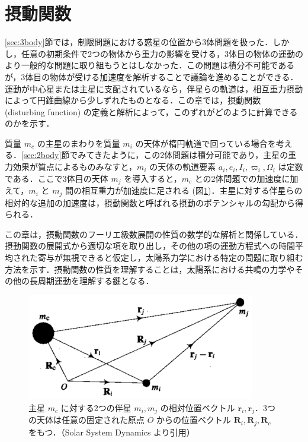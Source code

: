 \documentclass[11pt,a4paper,oneside,onecolumn]{jreport}
\begin{document}
\section{摂動関数 \label{sec:disturb_func}}
\ref{sec:3body}節では，制限問題における惑星の位置から3体問題を扱った．しかし，任意の初期条件で2つの物体から重力の影響を受ける，3体目の物体の運動のより一般的な問題に取り組もうとはしなかった．この問題は積分不可能であるが，3体目の物体が受ける加速度を解析することで議論を進めることができる．運動が中心星または主星に支配されているなら，伴星らの軌道は，相互重力摂動によって円錐曲線から少しずれたものとなる．この章では，摂動関数 (disturbing function) の定義と解析によって，このずれがどのように計算できるのかを示す．

質量 $m_c$ の主星のまわりを質量 $m_i$ の天体が楕円軌道で回っている場合を考える．\ref{sec:2body}節でみてきたように，この2体問題は積分可能であり，主星の重力効果が質点によるものみなすと，$m_i$ の天体の軌道要素 $a_i, e_i, I_i, \varpi_i, \Omega_i$ は定数である．ここで3体目の天体 $m_j$ を導入すると，$m_c$ との2体問題での加速度に加えて，$m_i$ と $m_j$ 間の相互重力が加速度に足される (図\ref{fig:disturbingfunc})．主星に対する伴星らの相対的な追加の加速度は，摂動関数と呼ばれる摂動のポテンシャルの勾配から得られる．

この章は，摂動関数のフーリエ級数展開の性質の数学的な解析と関係している．摂動関数の展開式から適切な項を取り出し，その他の項の運動方程式への時間平均された寄与が無視できると仮定し，太陽系力学における特定の問題に取り組む方法を示す．摂動関数の性質を理解することは，太陽系における共鳴の力学やその他の長周期運動を理解する鍵となる．

\begin{figure}[H]
\centering
\includegraphics[width=10cm]{./image/sec6_1.pdf}
\caption{主星 $m_c$ に対する2つの伴星 $m_i, m_j$ の相対位置ベクトル ${\bm r}_i, {\bm r}_j$．3つの天体は任意の固定された原点 $O$ からの位置ベクトル ${\bm R}_i, {\bm R}_j, {\bm R}_c$ をもつ．（Solar System Dynamics\cite{SSD} より引用）\label{fig:disturbingfunc}}
\end{figure}
\end{document}
